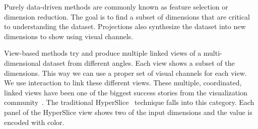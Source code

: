 Purely data-driven methods are commonly known as feature selection or dimension
reduction. The goal is to find a subset of dimensions that are critical to
understanding the dataset. 
 Projections also synthesize the
dataset into new dimensions to show using visual channels. 

View-based methods try and produce multiple linked views of a multi-dimensional
dataset from different angles. Each view shows a subset of the dimensions.
This way we can use a proper set of visual channels for each view.  We use
interaction to link these different views. These multiple, coordinated, linked
views have been one of the biggest success stories from the visualization
community~\cite{ref}. The traditional HyperSlice~\cite{Wijk:1993} technique
falls into this category. Each panel of the HyperSlice view shows two of the
input dimensions and the value is encoded with color.


